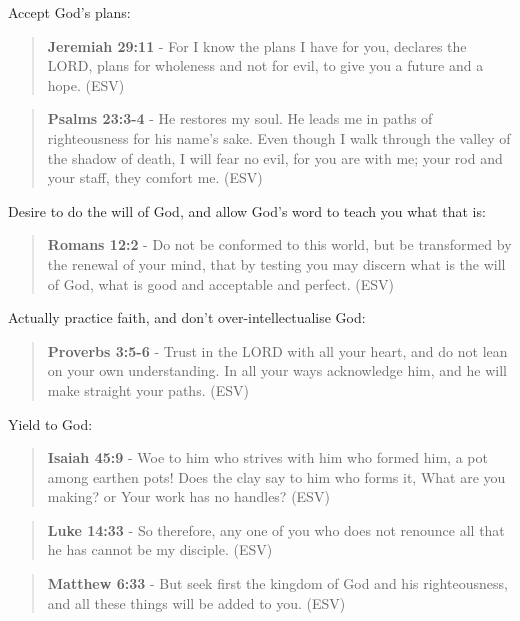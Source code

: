 \documentclass[11pt]{article}
\begin{document}
Accept God's plans:

\begin{quote}
\textbf{Jeremiah 29:11} - For I know the plans I have for you, declares the LORD, plans for wholeness and not for evil, to give you a future and a hope. (ESV)
\end{quote}

\begin{quote}
\textbf{Psalms 23:3-4} - He restores my soul. He leads me in paths of righteousness for his name's sake. Even though I walk through the valley of the shadow of death, I will fear no evil, for you are with me; your rod and your staff, they comfort me. (ESV)
\end{quote}

Desire to do the will of God, and allow God's word to teach you what that is:

\begin{quote}
\textbf{Romans 12:2} - Do not be conformed to this world, but be transformed by the renewal of your mind, that by testing you may discern what is the will of God, what is good and acceptable and perfect. (ESV)
\end{quote}

Actually practice faith, and don't over-intellectualise God:

\begin{quote}
\textbf{Proverbs 3:5-6} - Trust in the LORD with all your heart, and do not lean on your own understanding. In all your ways acknowledge him, and he will make straight your paths. (ESV)
\end{quote}

Yield to God:

\begin{quote}
\textbf{Isaiah 45:9} - Woe to him who strives with him who formed him, a pot among earthen pots! Does the clay say to him who forms it, What are you making? or Your work has no handles? (ESV)
\end{quote}

\begin{quote}
\textbf{Luke 14:33} - So therefore, any one of you who does not renounce all that he has cannot be my disciple. (ESV)
\end{quote}

\begin{quote}
\textbf{Matthew 6:33} - But seek first the kingdom of God and his righteousness, and all these things will be added to you. (ESV)
\end{quote}
\end{document}
